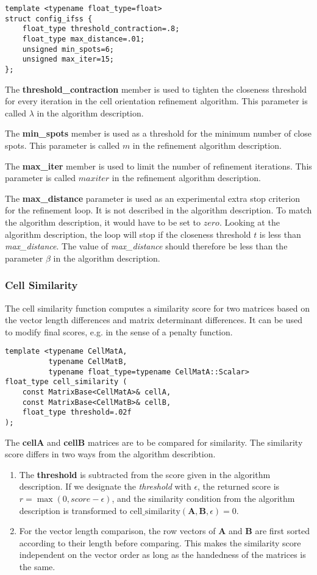 \documentclass[a4paper,10pt]{article}
\newcommand{\mat}[1]{\mathbf{#1}}
\begin{document}
\begin{lstlisting}
template <typename float_type=float>
struct config_ifss {
    float_type threshold_contraction=.8;
    float_type max_distance=.01;
    unsigned min_spots=6;
    unsigned max_iter=15;
};
\end{lstlisting}

The \textbf{threshold\_contraction} member is used to tighten the closeness threshold for every iteration in the cell orientation refinement algorithm. This parameter is called $\lambda$ in the algorithm description.

The \textbf{min\_spots} member is used as a threshold for the minimum number of close spots. This parameter is called $m$ in the refinement algorithm description.

The \textbf{max\_iter} member is used to limit the number of refinement iterations. This parameter is called $maxiter$ in the refinement algorithm description.

The \textbf{max\_distance} parameter is used as an experimental extra stop criterion for the refinement loop. It is not described in the algorithm description. To match the algorithm description, it would have to be set to $zero$. Looking at the algorithm description, the loop will stop if the closeness threshold $t$ is less than \emph{max\_distance}. The value of \emph{max\_distance} should therefore be less than the parameter $\beta$ in the algorithm description.

\subsubsection{Cell Similarity}

The cell similarity function computes a similarity score for two matrices based on the vector length differences and matrix determinant differences. It can be used to modify final scores, e.g. in the sense of a penalty function.
%
\begin{lstlisting}
template <typename CellMatA,
          typename CellMatB,
          typename float_type=typename CellMatA::Scalar>
float_type cell_similarity (
    const MatrixBase<CellMatA>& cellA,
    const MatrixBase<CellMatB>& cellB,
    float_type threshold=.02f
);
\end{lstlisting}
%
The \textbf{cellA} and \textbf{cellB} matrices are to be compared for similarity. The similarity score differs in two ways from the algorithm describtion.
%
\begin{enumerate}
 \item The \textbf{threshold} is subtracted from the score given in the algorithm description. If we designate the \emph{threshold} with $\epsilon$, the returned score is $r = \max(0, score - \epsilon)$, and the similarity condition from the algorithm description is transformed to $\text{cell\_similarity}(\mat{A},\mat{B},\epsilon) = 0$.
 \item For the vector length comparison, the row vectors of $\mat{A}$ and $\mat{B}$ are first sorted according to their length before comparing. This makes the similarity score independent on the vector order as long as the handedness of the matrices is the same.
\end{enumerate}
\end{document}
